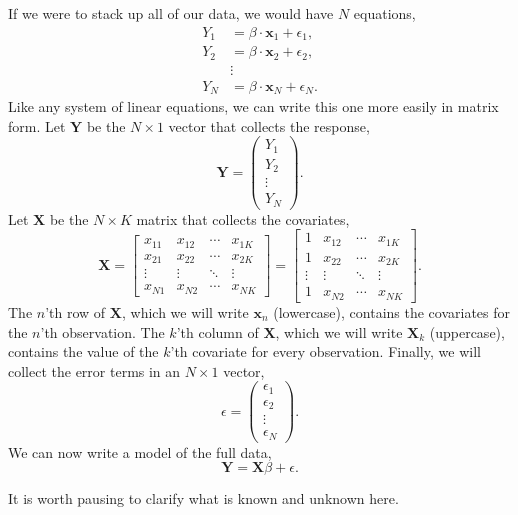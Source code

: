 \documentclass[12pt,oneside,openany]{book}
\begin{document}
If we were to stack up all of our data, we would have \(N\) equations,
\[
\begin{aligned}
Y_1 &= \beta \cdot \mathbf{x}_1 + \epsilon_1, \\
Y_2 &= \beta \cdot \mathbf{x}_2 + \epsilon_2, \\
&\vdots \\
Y_N &= \beta \cdot \mathbf{x}_N + \epsilon_N.
\end{aligned}
\] Like any system of linear equations, we can write this one more
easily in matrix form. Let \(\mathbf{Y}\) be the \(N \times 1\) vector
that collects the response, \[
\mathbf{Y} = \begin{pmatrix} Y_1 \\ Y_2 \\ \vdots \\ Y_N \end{pmatrix}.
\] Let \(\mathbf{X}\) be the \(N \times K\) matrix that collects the
covariates, \[
\mathbf{X} =
\begin{bmatrix}
  x_{11} & x_{12} & \cdots & x_{1K} \\
  x_{21} & x_{22} & \cdots & x_{2K} \\
  \vdots & \vdots & \ddots & \vdots \\
  x_{N1} & x_{N2} & \cdots & x_{NK}
\end{bmatrix}
=
\begin{bmatrix}
  1 & x_{12} & \cdots & x_{1K} \\
  1 & x_{22} & \cdots & x_{2K} \\
  \vdots & \vdots & \ddots & \vdots \\
  1 & x_{N2} & \cdots & x_{NK}
\end{bmatrix}.
\] The \(n\)'th row of \(\mathbf{X}\), which we will write
\(\mathbf{x}_n\) (lowercase), contains the covariates for the \(n\)'th
observation. The \(k\)'th column of \(\mathbf{X}\), which we will write
\(\mathbf{X}_k\) (uppercase), contains the value of the \(k\)'th
covariate for every observation. Finally, we will collect the error
terms in an \(N \times 1\) vector, \[
\epsilon = \begin{pmatrix} \epsilon_1 \\ \epsilon_2 \\ \vdots \\ \epsilon_N \end{pmatrix}.
\] We can now write a model of the full data, \[
\mathbf{Y} = \mathbf{X} \beta + \epsilon.
\]

It is worth pausing to clarify what is known and unknown here.
\end{document}
